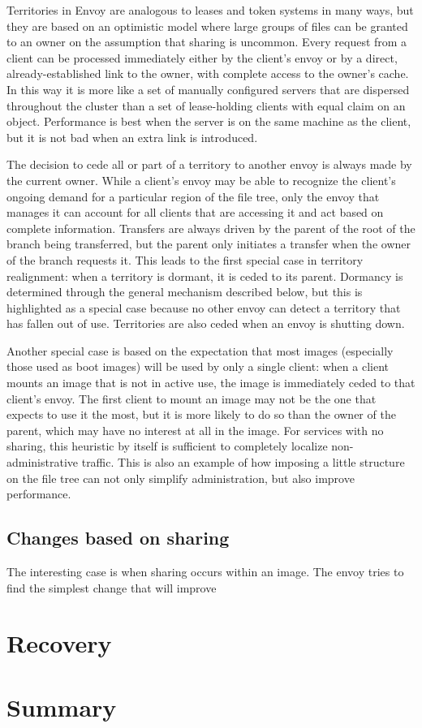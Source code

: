 Territories in Envoy are analogous to leases and token systems in many ways, but they are based on an optimistic model where large groups of files can be granted to an owner on the assumption that sharing is uncommon. Every request from a client can be processed immediately either by the client's envoy or by a direct, already-established link to the owner, with complete access to the owner's cache. In this way it is more like a set of manually configured servers that are dispersed throughout the cluster than a set of lease-holding clients with equal claim on an object. Performance is best when the server is on the same machine as the client, but it is not bad when an extra link is introduced.

The decision to cede all or part of a territory to another envoy is always made by the current owner. While a client's envoy may be able to recognize the client's ongoing demand for a particular region of the file tree, only the envoy that manages it can account for all clients that are accessing it and act based on complete information. Transfers are always driven by the parent of the root of the branch being transferred, but the parent only initiates a transfer when the owner of the branch requests it. This leads to the first special case in territory realignment: when a territory is dormant, it is ceded to its parent. Dormancy is determined through the general mechanism described below, but this is highlighted as a special case because no other envoy can detect a territory that has fallen out of use. Territories are also ceded when an envoy is shutting down.

Another special case is based on the expectation that most images (especially those used as boot images) will be used by only a single client: when a client mounts an image that is not in active use, the image is immediately ceded to that client's envoy. The first client to mount an image may not be the one that expects to use it the most, but it is more likely to do so than the owner of the parent, which may have no interest at all in the image. For services with no sharing, this heuristic by itself is sufficient to completely localize non-administrative traffic. This is also an example of how imposing a little structure on the file tree can not only simplify administration, but also improve performance.

\subsection{Changes based on sharing}

The interesting case is when sharing occurs within an image. The envoy tries to find the simplest change that will improve 

\section{Recovery}

\section{Summary}